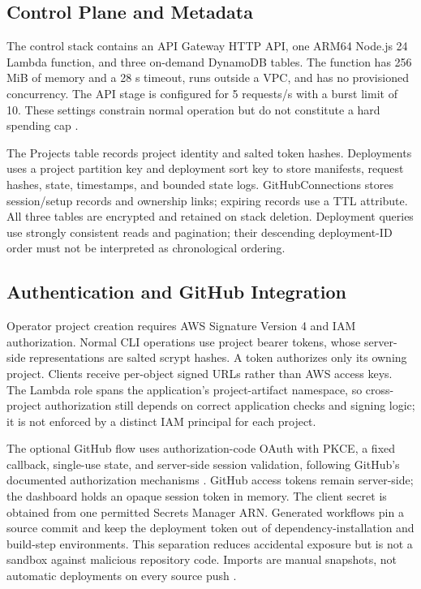 \documentclass[conference,letterpaper]{IEEEtran}
\begin{document}
\subsection{Control Plane and Metadata}
The control stack contains an API Gateway HTTP API, one ARM64 Node.js 24 Lambda function, and three on-demand DynamoDB tables. The function has 256 MiB of memory and a 28 s timeout, runs outside a VPC, and has no provisioned concurrency. The API stage is configured for 5 requests/s with a burst limit of 10. These settings constrain normal operation but do not constitute a hard spending cap \cite{r1}.

The Projects table records project identity and salted token hashes. Deployments uses a project partition key and deployment sort key to store manifests, request hashes, state, timestamps, and bounded state logs. GitHubConnections stores session/setup records and ownership links; expiring records use a TTL attribute. All three tables are encrypted and retained on stack deletion. Deployment queries use strongly consistent reads and pagination; their descending deployment-ID order must not be interpreted as chronological ordering.

\subsection{Authentication and GitHub Integration}
Operator project creation requires AWS Signature Version 4 and IAM authorization. Normal CLI operations use project bearer tokens, whose server-side representations are salted scrypt hashes. A token authorizes only its owning project. Clients receive per-object signed URLs rather than AWS access keys. The Lambda role spans the application's project-artifact namespace, so cross-project authorization still depends on correct application checks and signing logic; it is not enforced by a distinct IAM principal for each project.

The optional GitHub flow uses authorization-code OAuth with PKCE, a fixed callback, single-use state, and server-side session validation, following GitHub's documented authorization mechanisms \cite{r6}. GitHub access tokens remain server-side; the dashboard holds an opaque session token in memory. The client secret is obtained from one permitted Secrets Manager ARN. Generated workflows pin a source commit and keep the deployment token out of dependency-installation and build-step environments. This separation reduces accidental exposure but is not a sandbox against malicious repository code. Imports are manual snapshots, not automatic deployments on every source push \cite{r1}.
\end{document}
